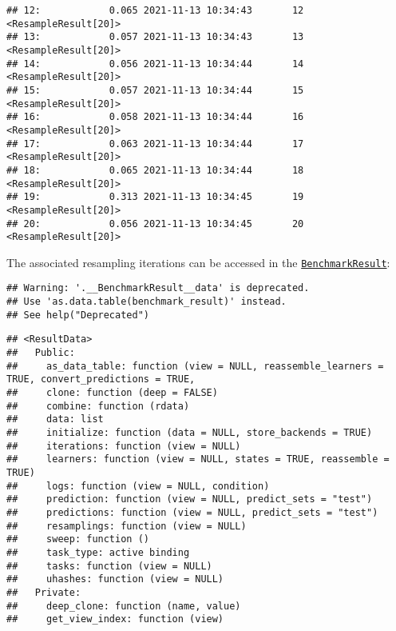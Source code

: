 \documentclass[
]{scrbook}
\newenvironment{Shaded}{\begin{snugshade}}{\end{snugshade}}
\newcommand{\NormalTok}[1]{#1}
\newcommand{\SpecialCharTok}[1]{\textcolor[rgb]{0.00,0.00,0.00}{#1}}
\renewenvironment{Shaded} {\begin{snugshade}\small} {\end{snugshade}}
\begin{document}
\begin{verbatim}
## 12:            0.065 2021-11-13 10:34:43       12 <ResampleResult[20]>
## 13:            0.057 2021-11-13 10:34:43       13 <ResampleResult[20]>
## 14:            0.056 2021-11-13 10:34:44       14 <ResampleResult[20]>
## 15:            0.057 2021-11-13 10:34:44       15 <ResampleResult[20]>
## 16:            0.058 2021-11-13 10:34:44       16 <ResampleResult[20]>
## 17:            0.063 2021-11-13 10:34:44       17 <ResampleResult[20]>
## 18:            0.065 2021-11-13 10:34:44       18 <ResampleResult[20]>
## 19:            0.313 2021-11-13 10:34:45       19 <ResampleResult[20]>
## 20:            0.056 2021-11-13 10:34:45       20 <ResampleResult[20]>
\end{verbatim}

The associated resampling iterations can be accessed in the \href{https://mlr3.mlr-org.com/reference/BenchmarkResult.html}{\texttt{BenchmarkResult}}:

\begin{Shaded}
\end{Shaded}

\begin{verbatim}
## Warning: '.__BenchmarkResult__data' is deprecated.
## Use 'as.data.table(benchmark_result)' instead.
## See help("Deprecated")
\end{verbatim}

\begin{verbatim}
## <ResultData>
##   Public:
##     as_data_table: function (view = NULL, reassemble_learners = TRUE, convert_predictions = TRUE, 
##     clone: function (deep = FALSE) 
##     combine: function (rdata) 
##     data: list
##     initialize: function (data = NULL, store_backends = TRUE) 
##     iterations: function (view = NULL) 
##     learners: function (view = NULL, states = TRUE, reassemble = TRUE) 
##     logs: function (view = NULL, condition) 
##     prediction: function (view = NULL, predict_sets = "test") 
##     predictions: function (view = NULL, predict_sets = "test") 
##     resamplings: function (view = NULL) 
##     sweep: function () 
##     task_type: active binding
##     tasks: function (view = NULL) 
##     uhashes: function (view = NULL) 
##   Private:
##     deep_clone: function (name, value) 
##     get_view_index: function (view)
\end{verbatim}
\end{document}

